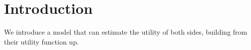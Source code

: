 \section{Introduction}

We introduce a model that can estimate the utility of both sides, building from their utility function up.